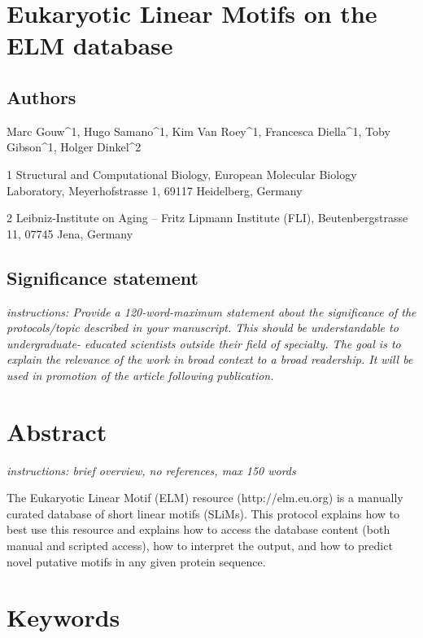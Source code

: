 
\section{Eukaryotic Linear Motifs on the ELM
database}\label{eukaryotic-linear-motifs-on-the-elm-database}

\subsection{Authors}\label{authors}

Marc Gouw\^{}1, Hugo Samano\^{}1, Kim Van Roey\^{}1, Francesca
Diella\^{}1, Toby Gibson\^{}1, Holger Dinkel\^{}2

1 Structural and Computational Biology, European Molecular Biology
Laboratory, Meyerhofstrasse 1, 69117 Heidelberg, Germany

2 Leibniz-Institute on Aging -- Fritz Lipmann Institute (FLI),
Beutenbergstrasse 11, 07745 Jena, Germany

\subsection{Significance statement}\label{significance-statement}

\emph{instructions: Provide a 120-word-maximum statement about the
significance of the protocols/topic described in your manuscript. This
should be understandable to undergraduate- educated scientists outside
their field of specialty. The goal is to explain the relevance of the
work in broad context to a broad readership. It will be used in
promotion of the article following publication.}

\section{Abstract}\label{abstract}

\emph{instructions: brief overview, no references, max 150 words}

The Eukaryotic Linear Motif (ELM) resource (http://elm.eu.org) is a
manually curated database of short linear motifs (SLiMs). This protocol
explains how to best use this resource and explains how to access the
database content (both manual and scripted access), how to interpret the
output, and how to predict novel putative motifs in any given protein
sequence.

\section{Keywords}\label{keywords}

